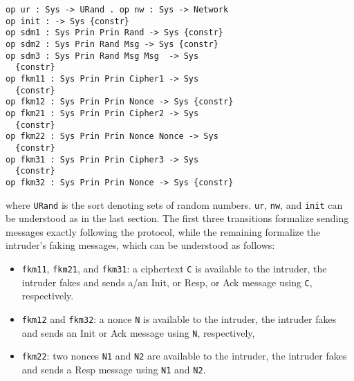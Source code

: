\documentclass[10pt, conference, compsocconf]{IEEEtran}
\begin{document}
\begin{small}
	\begin{verbatim}
op ur : Sys -> URand . op nw : Sys -> Network
op init : -> Sys {constr}
op sdm1 : Sys Prin Prin Rand -> Sys {constr}
op sdm2 : Sys Prin Rand Msg -> Sys {constr}
op sdm3 : Sys Prin Rand Msg Msg  -> Sys 
  {constr}
op fkm11 : Sys Prin Prin Cipher1 -> Sys 
  {constr}
op fkm12 : Sys Prin Prin Nonce -> Sys {constr}
op fkm21 : Sys Prin Prin Cipher2 -> Sys 
  {constr}
op fkm22 : Sys Prin Prin Nonce Nonce -> Sys 
  {constr}
op fkm31 : Sys Prin Prin Cipher3 -> Sys 
  {constr}
op fkm32 : Sys Prin Prin Nonce -> Sys {constr}
	\end{verbatim}
\end{small}


\noindent
where \verb!URand! is the sort denoting sets of random numbers.
\verb!ur!, \verb!nw!, and \verb!init! can be understood as in the last section.
The first three transitions formalize sending messages exactly following the protocol, while the remaining formalize the intruder's faking messages, which can be understood as follows:

\begin{itemize}
	\item \verb!fkm11!, \verb!fkm21!, and \verb!fkm31!: a ciphertext \verb!C! is available to the intruder, the intruder fakes and sends a/an Init, or Resp, or Ack message using \verb!C!, respectively.
	\item \verb!fkm12! and \verb!fkm32!: a nonce \verb!N! is available to the intruder, the intruder fakes and sends an Init or Ack message using \verb!N!, respectively, 
	\item \verb!fkm22!: two nonces \verb!N1! and \verb!N2! are available to the intruder, the intruder fakes and sends a Resp message using \verb!N1! and \verb!N2!.
\end{itemize}


%
\end{document}
